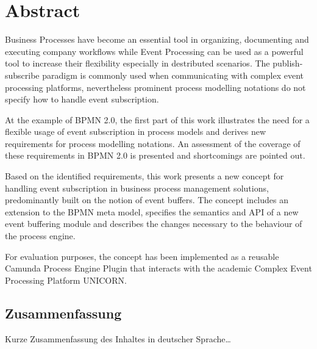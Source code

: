 \begingroup
\let\clearpage\relax
\let\cleardoublepage\relax
\let\cleardoublepage\relax

\chapter*{Abstract}
Business Processes have become an essential tool in organizing, documenting and executing company workflows while Event Processing can be used as a powerful tool to increase their flexibility especially in destributed scenarios. 
The publish-subscribe paradigm is commonly used when communicating with complex event processing platforms, nevertheless prominent process modelling notations do not specify how to handle event subscription.

At the example of BPMN 2.0, the first part of this work illustrates the need for a flexible usage of event subscription in process models and derives new requirements for process modelling notations. An assessment of the coverage of these requirements in BPMN 2.0 is presented and shortcomings are pointed out.

Based on the identified requirements, this work presents a new concept for handling event subscription in business process management solutions, predominantly built on the notion of event buffers. The concept includes an extension to the BPMN meta model, specifies the semantics and API of a new event buffering module and describes the changes necessary to the behaviour of the process engine.

For evaluation purposes, the concept has been implemented as a reusable Camunda Process Engine Plugin that interacts with the academic Complex Event Processing Platform UNICORN.



\vfill

\begin{otherlanguage}{ngerman}
\chapter*{Zusammenfassung}
Kurze Zusammenfassung des Inhaltes in deutscher Sprache\dots 
\end{otherlanguage}

\endgroup			

\vfill